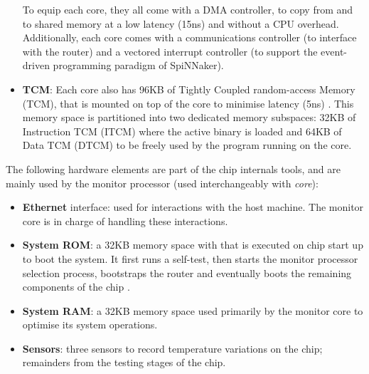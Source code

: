 \begin{itemize}
To equip each core, they all come with a DMA controller, to copy from and to shared memory at a low latency (15ns)\cite{spin-chip-resources} and without a CPU overhead. Additionally, each core comes with a communications controller (to interface with the router) and a vectored interrupt controller (to support the event-driven programming paradigm of SpiNNaker).

\item \textbf{TCM}: Each core also has 96KB of Tightly Coupled random-access Memory (TCM), that is mounted on top of the core to minimise latency (5ns) \cite{spin-chip-resources}. This memory space is partitioned into two dedicated memory subspaces: 32KB of Instruction TCM (ITCM) where the active binary is loaded and 64KB of Data TCM (DTCM) to be freely used by the program running on the core.
\end{itemize}

The following hardware elements are part of the chip internals tools, and are mainly used by the monitor processor (used interchangeably with \textit{core}):

\begin{itemize}
\item \textbf{Ethernet} interface: used for interactions with the host machine. The monitor core is in charge of handling these interactions.

\item \textbf{System ROM}: a 32KB memory space with that is executed on chip start up to boot the system. It first runs a self-test, then starts the monitor processor selection process, bootstraps the router and eventually boots the remaining components of the chip \cite{testchip}.

\item \textbf{System RAM}: a 32KB memory space used primarily by the monitor core to optimise its system operations.

\item \textbf{Sensors}: three sensors to record temperature variations on the chip; remainders from the testing stages of the chip.

\end{itemize}

